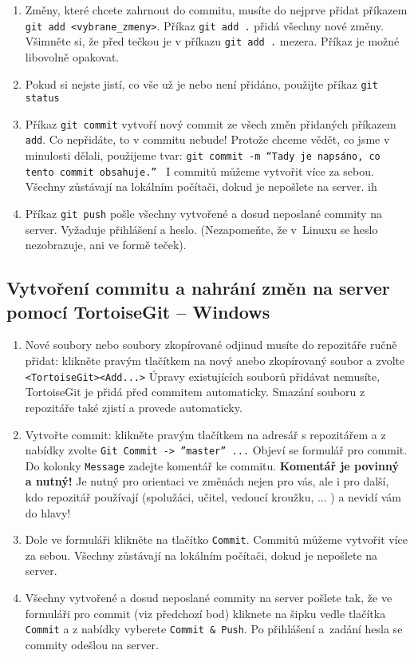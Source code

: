 \begin{enumerate}
	\item Změny, které chcete zahrnout do commitu,  musíte do nejprve přidat příkazem {\tt git add <vybrane\_zmeny>}. 
	Příkaz {\tt git add .} přidá všechny nové změny.  Všimněte si, že před tečkou je 
	v příkazu {\tt git add .} mezera. Příkaz je možné libovolně opakovat. 
	
	\item Pokud si nejste jistí, co vše už je nebo není přidáno, použijte příkaz {\tt git status}
	
	\item Příkaz {\tt git commit} vytvoří nový commit ze všech změn přidaných příkazem {\tt add}. Co nepřidáte, to v commitu nebude!
	Protože chceme vědět, co jsme v minulosti dělali, použijeme tvar: 
	{\tt git commit -m ``Tady je napsáno, co tento commit obsahuje.'' }  I commitů můžeme vytvořit více za sebou. Všechny zůstávají na lokálním počítači, dokud je nepošlete na server. 
	ih
	\item Příkaz {\tt git push} pošle všechny vytvořené a dosud neposlané commity na server. Vyžaduje přihlášení a heslo. (Nezapomeňte, že v~Linuxu se heslo nezobrazuje, ani ve formě teček). 
	
	
\end{enumerate}


\subsection{Vytvoření commitu a nahrání změn na server pomocí TortoiseGit -- Windows}

\begin{enumerate}
	\item Nové soubory nebo soubory zkopírované odjinud musíte do repozitáře ručně přidat: 
	klikněte pravým tlačítkem na nový anebo zkopírovaný soubor a zvolte {\tt <TortoiseGit><Add...>} 
	Úpravy existujících souborů přidávat nemusíte, TortoiseGit je přidá před commitem automaticky. 
	Smazání souboru z repozitáře také zjistí a provede automaticky.

	\item Vytvořte commit: klikněte pravým tlačítkem na adresář s repozitářem a z nabídky zvolte {\tt Git Commit -> ''master'' ...}
	Objeví se formulář pro commit. Do kolonky {\tt Message} zadejte komentář ke commitu. 
	{\bf Komentář je povinný a nutný!} 
	Je nutný pro orientaci ve změnách nejen pro vás, ale i pro další, kdo repozitář používají (spolužáci, učitel, vedoucí kroužku, ... )  a nevidí vám do hlavy!
	
	\item Dole ve formuláři klikněte na tlačítko {\tt Commit}. Commitů můžeme vytvořit více za sebou. Všechny zůstávají na lokálním počítači, dokud je nepošlete na server.
	
	\item Všechny vytvořené a dosud neposlané commity na server pošlete tak, že ve formuláři pro commit (viz předchozí bod) kliknete 
	na šipku vedle tlačítka {\tt Commit} a z nabídky vyberete {\tt Commit \& Push}. Po přihlášení a~zadání hesla se commity odešlou na server.
	
	
	
	
\end{enumerate}
